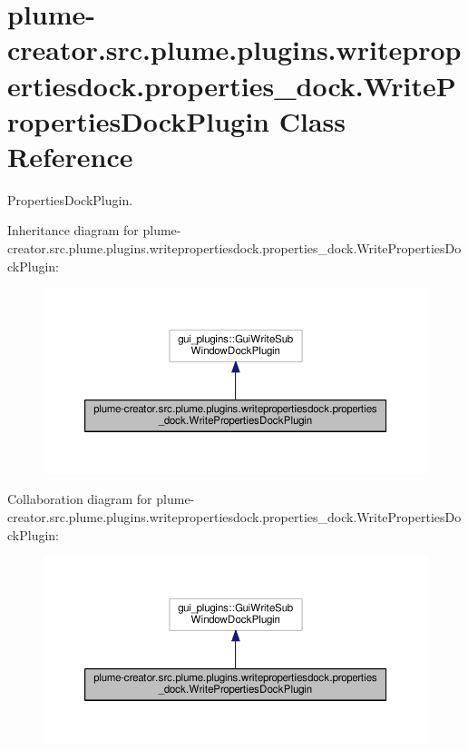 \hypertarget{classplume-creator_1_1src_1_1plume_1_1plugins_1_1writepropertiesdock_1_1properties__dock_1_1_write_properties_dock_plugin}{}\section{plume-\/creator.src.\+plume.\+plugins.\+writepropertiesdock.\+properties\+\_\+dock.\+Write\+Properties\+Dock\+Plugin Class Reference}
\label{classplume-creator_1_1src_1_1plume_1_1plugins_1_1writepropertiesdock_1_1properties__dock_1_1_write_properties_dock_plugin}


Properties\+Dock\+Plugin.  




Inheritance diagram for plume-\/creator.src.\+plume.\+plugins.\+writepropertiesdock.\+properties\+\_\+dock.\+Write\+Properties\+Dock\+Plugin\+:\nopagebreak
\begin{figure}[H]
\begin{center}
\leavevmode
\includegraphics[width=350pt]{classplume-creator_1_1src_1_1plume_1_1plugins_1_1writepropertiesdock_1_1properties__dock_1_1_wri4705907d48d77c3484c1de94f980e8f3}
\end{center}
\end{figure}


Collaboration diagram for plume-\/creator.src.\+plume.\+plugins.\+writepropertiesdock.\+properties\+\_\+dock.\+Write\+Properties\+Dock\+Plugin\+:\nopagebreak
\begin{figure}[H]
\begin{center}
\leavevmode
\includegraphics[width=350pt]{classplume-creator_1_1src_1_1plume_1_1plugins_1_1writepropertiesdock_1_1properties__dock_1_1_wrie655381ee44989faf4b70d962b510c15}
\end{center}
\end{figure}
